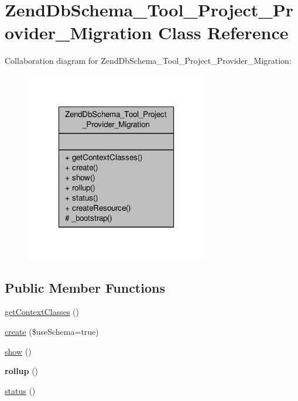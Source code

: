 \hypertarget{classZendDbSchema__Tool__Project__Provider__Migration}{\section{Zend\-Db\-Schema\-\_\-\-Tool\-\_\-\-Project\-\_\-\-Provider\-\_\-\-Migration Class Reference}
\label{classZendDbSchema__Tool__Project__Provider__Migration}
}


Collaboration diagram for Zend\-Db\-Schema\-\_\-\-Tool\-\_\-\-Project\-\_\-\-Provider\-\_\-\-Migration\-:\nopagebreak
\begin{figure}[H]
\begin{center}
\leavevmode
\includegraphics[width=226pt]{classZendDbSchema__Tool__Project__Provider__Migration__coll__graph}
\end{center}
\end{figure}
\subsection*{Public Member Functions}
\begin{DoxyCompactItemize}
\item 
\hyperlink{classZendDbSchema__Tool__Project__Provider__Migration_a7f2668ee9510542ce73b6edfb34ddff7}{get\-Context\-Classes} ()
\item 
\hyperlink{classZendDbSchema__Tool__Project__Provider__Migration_a50a6e8f60a7d71a74883b26797fa9f25}{create} (\$use\-Schema=true)
\item 
\hyperlink{classZendDbSchema__Tool__Project__Provider__Migration_a655dfecdd97d178fe409092d1111416d}{show} ()
\item 
\hypertarget{classZendDbSchema__Tool__Project__Provider__Migration_a183ffff63bca0f426c4ec39f331e080e}{{\bfseries rollup} ()}\label{classZendDbSchema__Tool__Project__Provider__Migration_a183ffff63bca0f426c4ec39f331e080e}

\item 
\hyperlink{classZendDbSchema__Tool__Project__Provider__Migration_a6818e8df15f087c869ed9edf28d97f1f}{status} ()
\end{DoxyCompactItemize}
